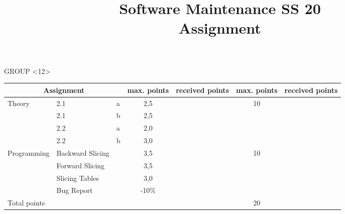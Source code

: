 \documentclass[10pt, a4paper]{article}
\author{\AuthorFront}
\date{} %
\title{Software Maintenance SS 20\\Assignment \AssignmentNumber}
\newcommand{\GroupNumber}{12}
\begin{document}
\newcommand{\abc}{\item[\alph{ale})]\stepcounter{ale}}
\newenvironment{liste}{\begin{itemize}}{\end{itemize}}
\newcommand{\aliste}{\begin{liste} \setcounter{ale}{1}}
\newcommand{\zliste}{\end{liste}}
\newenvironment{abcliste}{\aliste}{\zliste}


\maketitle
\begin{center}
 GROUP \textless \GroupNumber \textgreater
\end{center}
\thispagestyle{fancy}

\begin{table}[h!]
\centering
\def\arraystretch{2}
\begin{tabular}{|l|l|l|c|c|c|c|}
\hline
\multicolumn{3}{|c|}{\textbf{Assignment}} & \textbf{max. points} & \textbf{received points} & \textbf{max. points} & \textbf{received points}  \\
\hline
\multirow{4}{*}{Theory}&2.1 & a & 2,5 &  & \multirow{4}{*}{10} & \\ \cline{2-5}
&2.1 & b & 2,5 &  &  & \\ \cline{2-5}
&2.2 & a & 2,0 &  &  & \\ \cline{2-5} 
&2.2 & b & 3,0 &  &  & \\ \cline{2-5}
\hline
\multirow{3}{*}{Programming}&Backward Slicing& & 3,5 &  & \multirow{4}{*}{10} & \\ \cline{2-5}
&Forward Slicing & & 3,5 &  &  & \\ \cline{2-5}
&Slicing Tables & & 3,0 &  &  & \\ \cline{2-5}
&Bug Report& & -10\% &  &  & \\ \cline{2-5}
\hline
\multicolumn{5}{|l|}{Total points}& 20 &\\
\hline
\end{tabular}
\end{table}
\newpage
\end{document}
